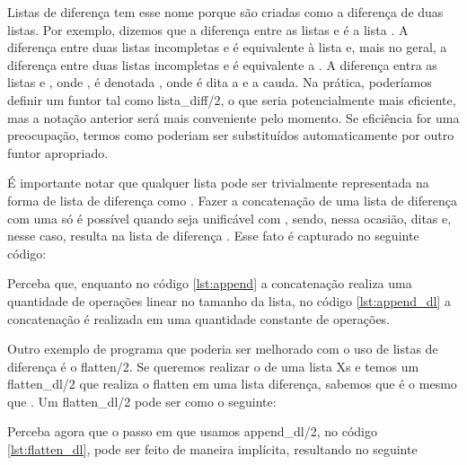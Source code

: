 \documentclass{article}
\begin{document}
Listas de diferença tem esse nome porque são criadas como a diferença de duas listas. Por exemplo, dizemos que  a diferença entre as listas
\codigo{[a,b,c]} e \codigo{[c]} é a lista \codigo{[a,b]}. A diferença entre duas listas incompletas \codigo{[a,b|Xs]} e  é equivalente à lista \codigo{[a,b]} e, mais no geral, a diferença entre duas listas incompletas \codigo{[$x_0$, ...,$x_i$|Xs]} e  é equivalente a \codigo{[$x_0$, ...,$x_i$]}.
A diferença entra as listas  e , onde , é denotada , onde  é dita a  e  a cauda. Na prática,
poderíamos definir um funtor tal como lista\_diff/2, o que seria potencialmente mais eficiente, mas a notação anterior será
mais conveniente pelo momento. Se eficiência for uma preocupação, termos como  poderiam ser substituídos automaticamente por outro funtor apropriado.

É importante notar que qualquer lista  pode ser trivialmente representada na forma de lista de diferença como . Fazer a concatenação de uma lista de diferença  com uma 
só é possível quando  seja unificável com , sendo, nessa ocasião, ditas   e, nesse caso, resulta na lista de diferença . Esse fato é capturado no seguinte código:

\label{lst:append_dl}

Perceba que, enquanto no código \ref{lst:append} a concatenação realiza uma quantidade de operações linear no tamanho da lista,
no código \ref{lst:append_dl} a concatenação é realizada em uma quantidade constante de operações.

Outro exemplo de programa que poderia ser melhorado com o uso de listas de diferença é o flatten/2. Se queremos realizar o  de uma lista Xs e temos um flatten\_dl/2 que realiza o flatten em uma lista diferença, sabemos que  é o mesmo que . Um flatten\_dl/2 pode ser como o seguinte:

\label{lst:flatten_dl}

Perceba agora que o passo em que usamos append\_dl/2, no código \ref{lst:flatten_dl}, pode ser feito de maneira implícita, resultando no seguinte
\end{document}
